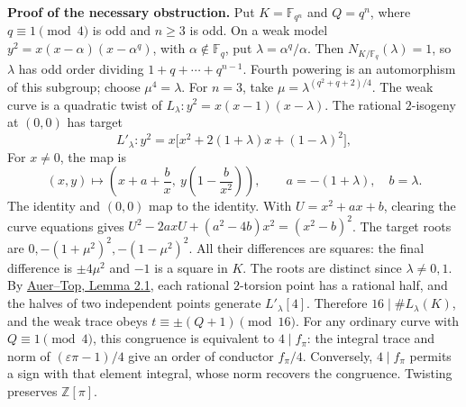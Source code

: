 \documentclass[10pt]{extarticle}
\begin{document}
\clearpage
\noindent\textbf{Proof of the necessary obstruction.} Put
$K=\mathbb F_{q^n}$ and $Q=q^n$, where $q\equiv1\pmod4$ is odd
and $n\ge3$ is odd. On a weak model
$y^2=x(x-\alpha)(x-\alpha^q)$, with $\alpha\notin\mathbb F_q$, put
$\lambda=\alpha^q/\alpha$.
Then $N_{K/\mathbb F_q}(\lambda)=1$, so $\lambda$ has odd order
dividing $1+q+\cdots+q^{n-1}$. Fourth powering is an automorphism of
this subgroup; choose $\mu^4=\lambda$.
For $n=3$, take $\mu=\lambda^{(q^2+q+2)/4}$.
The weak curve is a quadratic twist of
$L_\lambda:y^2=x(x-1)(x-\lambda)$. The rational $2$-isogeny
at $(0,0)$ has target
\[
L'_\lambda:y^2=x\bigl[x^2+2(1+\lambda)x+(1-\lambda)^2\bigr],
\]
For $x\ne0$, the map is
\[
 (x,y)\longmapsto \left(x+a+\frac b x,\ y\left(1-\frac b{x^2}\right)\right),
 \qquad a=-(1+\lambda),\quad b=\lambda.
\]
The identity and $(0,0)$ map to the identity. With $U=x^2+ax+b$,
clearing the curve equations gives
$U^2-2axU+(a^2-4b)x^2=(x^2-b)^2$.
The target roots are $0,-(1+\mu^2)^2,-(1-\mu^2)^2$. All their differences
are squares: the final difference is $\pm4\mu^2$ and $-1$ is a
square in $K$. The roots are distinct since $\lambda\ne0,1$.
By \href{https://arxiv.org/pdf/math/0106273}{Auer--Top, Lemma 2.1},
each rational $2$-torsion point has a rational half, and the halves
of two independent points generate $L'_\lambda[4]$. Therefore
$16\mid\#L_\lambda(K)$, and the weak trace obeys
$t\equiv\pm(Q+1)\pmod{16}$.
For any ordinary curve with $Q\equiv1\pmod4$, this congruence is
equivalent to $4\mid f_\pi$: the integral trace and norm of
$(\varepsilon\pi-1)/4$ give an order of conductor $f_\pi/4$.
Conversely, $4\mid f_\pi$ permits a sign with that element integral,
whose norm recovers the congruence. Twisting preserves $\mathbb Z[\pi]$.
\end{document}
